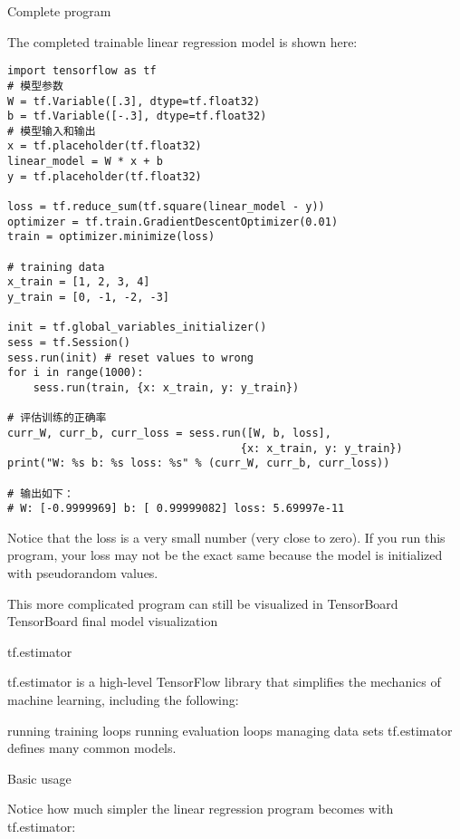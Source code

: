 Complete program

The completed trainable linear regression model is shown here:

\begin{verbatim}
import tensorflow as tf
# 模型参数
W = tf.Variable([.3], dtype=tf.float32)
b = tf.Variable([-.3], dtype=tf.float32)
# 模型输入和输出
x = tf.placeholder(tf.float32)
linear_model = W * x + b
y = tf.placeholder(tf.float32)

loss = tf.reduce_sum(tf.square(linear_model - y))
optimizer = tf.train.GradientDescentOptimizer(0.01)
train = optimizer.minimize(loss)

# training data
x_train = [1, 2, 3, 4]
y_train = [0, -1, -2, -3]

init = tf.global_variables_initializer()
sess = tf.Session()
sess.run(init) # reset values to wrong
for i in range(1000):
    sess.run(train, {x: x_train, y: y_train})

# 评估训练的正确率
curr_W, curr_b, curr_loss = sess.run([W, b, loss],
                                    {x: x_train, y: y_train})
print("W: %s b: %s loss: %s" % (curr_W, curr_b, curr_loss))

# 输出如下：
# W: [-0.9999969] b: [ 0.99999082] loss: 5.69997e-11
\end{verbatim}

Notice that the loss is a very small number (very close to zero). If you run this program, your loss may not be the exact same because the model is initialized with pseudorandom values.

This more complicated program can still be visualized in TensorBoard TensorBoard final model visualization

tf.estimator

tf.estimator is a high-level TensorFlow library that simplifies the mechanics of machine learning, including the following:

running training loops
running evaluation loops
managing data sets
tf.estimator defines many common models.

Basic usage

Notice how much simpler the linear regression program becomes with tf.estimator:


